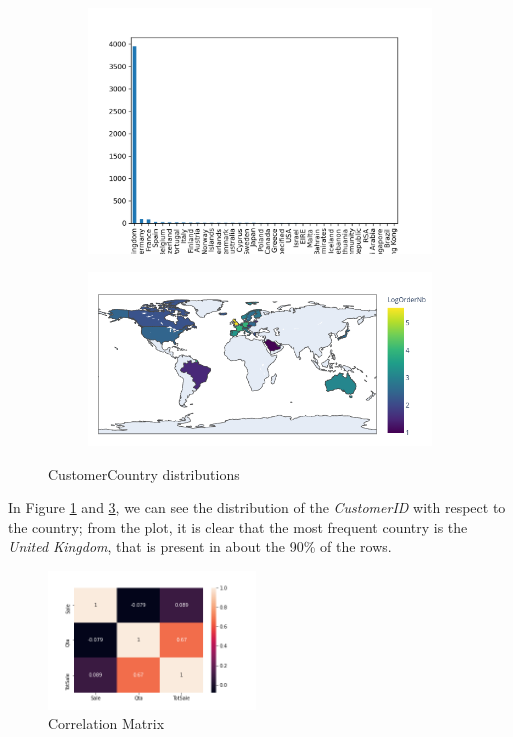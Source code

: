 \begin{figure}[!h]
\begin{subfigure}{.5\textwidth}
\centering
\includegraphics[width=.93\textwidth]{img/orders_country_bar.png}
\caption{}
\label{fig:orders_country_bar}
\end{subfigure}
\begin{subfigure}{.5\textwidth}
\centering
\includegraphics[width=.93\textwidth]{img/orders_country.png}
\caption{}
\label{fig:orders_country}
\end{subfigure}
\caption{CustomerCountry distributions}
\end{figure}

In Figure \ref{fig:orders_country_bar} and \ref{fig:orders_country}, we can see the distribution of the \emph{CustomerID} with respect to the country; from the plot, it is clear that the most frequent country is the \emph{United Kingdom}, that is present in about the 90\% of the rows.

\begin{figure}
\centering
\includegraphics[width=0.49\textwidth]{img/dataset_corr.png}
\caption{Correlation Matrix}
\label{fig:dataset_corr}
\end{figure}

